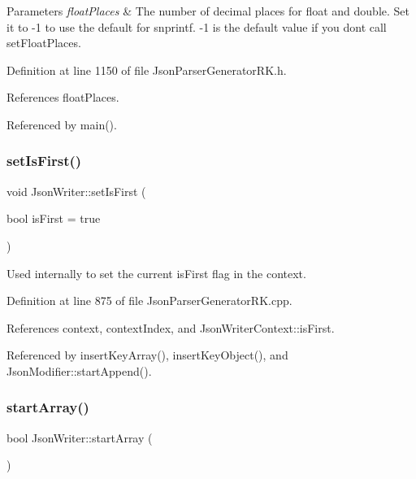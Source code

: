 \begin{DoxyParams}{Parameters}
{\em float\+Places} & The number of decimal places for float and double. Set it to -\/1 to use the default for snprintf. -\/1 is the default value if you don\textquotesingle{}t call set\+Float\+Places. \\
\hline
\end{DoxyParams}


Definition at line 1150 of file Json\+Parser\+Generator\+R\+K.\+h.



References float\+Places.



Referenced by main().

\mbox{\label{class_json_writer_afc30ff673c866c7a2366a8c064b5a565}} 
\subsubsection{\texorpdfstring{set\+Is\+First()}{setIsFirst()}}
{\footnotesize\ttfamily void Json\+Writer\+::set\+Is\+First (\begin{DoxyParamCaption}\item[{bool}]{is\+First = {\ttfamily true} }\end{DoxyParamCaption})}



Used internally to set the current is\+First flag in the context. 



Definition at line 875 of file Json\+Parser\+Generator\+R\+K.\+cpp.



References context, context\+Index, and Json\+Writer\+Context\+::is\+First.



Referenced by insert\+Key\+Array(), insert\+Key\+Object(), and Json\+Modifier\+::start\+Append().

\mbox{\label{class_json_writer_a7ccfcbf66a8ed9a2728e6f6ae4b705ec}} 
\subsubsection{\texorpdfstring{start\+Array()}{startArray()}}
{\footnotesize\ttfamily bool Json\+Writer\+::start\+Array (\begin{DoxyParamCaption}{ }\end{DoxyParamCaption})\hspace{0.3cm}{\ttfamily [inline]}}



